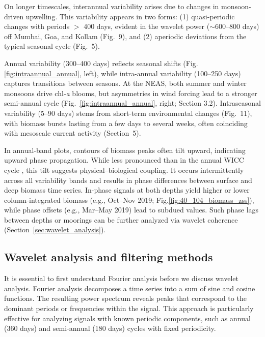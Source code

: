 \documentclass[12pt,a4paper]{article}
\begin{document}
On longer timescales, interannual variability arises due to changes in monsoon-driven upwelling. This variability appears in two forms: (1) quasi-periodic changes with periods $>$ 400 days, evident in the wavelet power ($\sim$600--800 days) off Mumbai, Goa, and Kollam (Fig.~9), and (2) aperiodic deviations from the typical seasonal cycle (Fig.~5).

Annual variability (300--400 days) reflects seasonal shifts (Fig.\ref{fig:intraannual_annual}, left), while intra-annual variability (100--250 days) captures transitions between seasons. At the NEAS, both summer and winter monsoons drive chl‑\textit{a} blooms, but asymmetries in wind forcing lead to a stronger semi-annual cycle \citep{jensen1993equatorial, schott20011} (Fig.~\ref{fig:intraannual_annual}, right; Section 3.2). Intraseasonal variability (5--90 days) stems from short-term environmental changes (Fig.~11), with biomass bursts lasting from a few days to several weeks, often coinciding with mesoscale current activity \citep{amol2014observed, chaudhuri2020observed} (Section~5).

In annual-band plots, contours of biomass peaks often tilt upward, indicating upward phase propagation. While less pronounced than in the annual WICC cycle \citep{amol2014observed, chaudhuri2020observed, chaudhuri2021observed}, this tilt suggests physical–biological coupling. It occurs intermittently across all variability bands and results in phase differences between surface and deep biomass time series. In-phase signals at both depths yield higher or lower column-integrated biomass (e.g., Oct--Nov 2019; Fig.\ref{fig:40_104_biomass_zss}), while phase offsets (e.g., Mar--May 2019) lead to subdued values. Such phase lags between depths or moorings can be further analyzed via wavelet coherence (Section~\ref{sec:wavelet_analysis}).

\subsection{Wavelet analysis and filtering methods}
\label{sec:wavelet_lanczos}
It is essential to first understand Fourier analysis before we discuss wavelet analysis. Fourier analysis decomposes a time series into a sum of sine and cosine functions. The resulting power spectrum reveals peaks that correspond to the dominant periods or frequencies within the signal. This approach is particularly effective for analyzing signals with known periodic components, such as annual (360 days) and semi-annual (180 days) cycles with fixed periodicity. 
\end{document}
